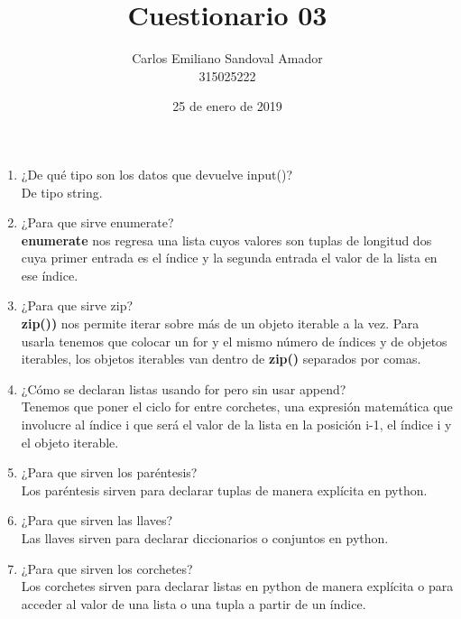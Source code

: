 \documentclass[letterpaper, 12pt, oneside]{article}%
\title{Cuestionario 03}
\author{Carlos Emiliano Sandoval Amador \\ 315025222}
\date{25 de enero de 2019}
\begin{document}
	\maketitle
	\begin{enumerate}
		\item ¿De qué tipo son los datos que devuelve input()? \\ De tipo string.
		\item ¿Para que sirve enumerate? \\  \textbf{enumerate} nos regresa una lista cuyos valores son tuplas de longitud dos cuya primer entrada es el índice y la segunda entrada el valor de la lista en ese índice.
		\item ¿Para que sirve zip? \\ 	 \textbf{zip())} nos permite iterar sobre más de un objeto iterable a la vez. Para usarla tenemos que colocar un for y el mismo número de índices y de objetos iterables, los objetos iterables van dentro de \textbf{zip()} separados por comas.
		\item ¿Cómo se declaran listas usando for pero sin usar append? \\ Tenemos que poner el ciclo for entre corchetes, una expresión matemática que involucre al índice i que será el valor de la lista en la posición i-1, el índice i y el objeto iterable. 
		\item ¿Para que sirven los paréntesis? \\ Los paréntesis sirven para declarar tuplas de manera explícita en python.
		\item ¿Para que sirven las llaves? \\ Las llaves sirven para declarar diccionarios o conjuntos en python.
		\item ¿Para que sirven los corchetes? \\ Los corchetes sirven para declarar listas en python de manera explícita o para acceder al valor de una lista o una tupla a partir de un índice.
	\end{enumerate}
\end{document}
